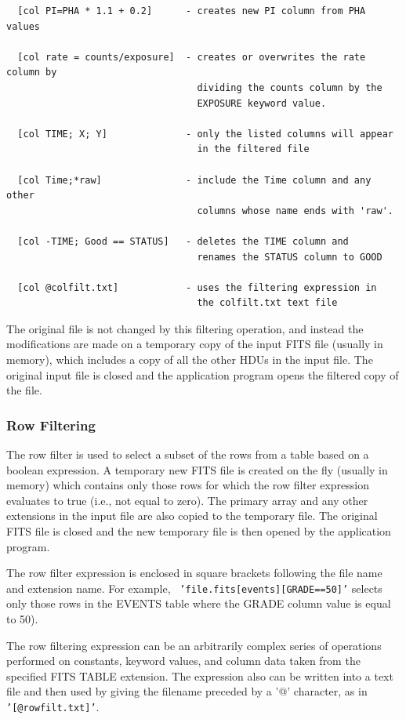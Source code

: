 \documentclass[11pt]{article}
\begin{document}
\begin{verbatim}
  [col PI=PHA * 1.1 + 0.2]      - creates new PI column from PHA values

  [col rate = counts/exposure]  - creates or overwrites the rate column by
                                  dividing the counts column by the
                                  EXPOSURE keyword value.

  [col TIME; X; Y]              - only the listed columns will appear
                                  in the filtered file

  [col Time;*raw]               - include the Time column and any other
                                  columns whose name ends with 'raw'.

  [col -TIME; Good == STATUS]   - deletes the TIME column and
                                  renames the STATUS column to GOOD

  [col @colfilt.txt]            - uses the filtering expression in
                                  the colfilt.txt text file
\end{verbatim}

The original file is not changed by this filtering operation, and
instead the modifications are made on a temporary copy of the input
FITS file (usually in memory), which includes a copy of all the other
HDUs in the input file.   The original input file is closed and the
application program opens the filtered copy of the file.

\subsubsection{Row Filtering}

The row filter is used to select a subset of the rows from a table
based on a boolean expression.  A temporary new FITS file is created on
the fly (usually in memory) which contains only those rows for which
the row filter expression evaluates to true (i.e., not equal to zero).
The primary array and any other extensions in the input file are also
copied to the temporary file.  The original FITS file is closed and the
new temporary file is then opened by the application program.

The row filter expression is enclosed in square brackets following the
file name and extension name.  For example, {\tt
'file.fits[events][GRADE==50]'}  selects only those rows in the EVENTS
table where the GRADE column value is equal to 50).

The row filtering  expression can be an arbitrarily  complex series of
operations performed  on constants,  keyword values,  and column data
taken from the specified FITS TABLE extension.  The expression
also can be written into a text file and then used by giving the
filename preceded by a '@' character, as in
{\tt '[@rowfilt.txt]'}.
\end{document}
